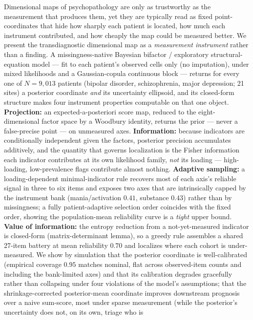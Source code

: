 Dimensional maps of psychopathology are only as trustworthy as the measurement
that produces them, yet they are typically read as fixed point-coordinates that
hide how sharply each patient is located, how much each instrument contributed,
and how cheaply the map could be measured better. We present the transdiagnostic
dimensional map as a \emph{measurement instrument} rather than a finding. A
missingness-native Bayesian bifactor / exploratory structural-equation model ---
fit to each patient's observed cells only (no imputation), under mixed
likelihoods and a Gaussian-copula continuous block --- returns for every one of
$N=9{,}013$ patients (bipolar disorder, schizophrenia, major depression; 21
sites) a posterior coordinate \emph{and} its uncertainty ellipsoid, and its
closed-form structure makes four instrument properties computable on that one
object. \textbf{Projection:} an expected-a-posteriori score map, reduced to the
eight-dimensional factor space by a Woodbury identity, returns the prior --- never
a false-precise point --- on unmeasured axes. \textbf{Information:} because
indicators are conditionally independent given the factors, posterior precision
accumulates additively, and the quantity that governs localization is the Fisher
information each indicator contributes at its own likelihood family, \emph{not}
its loading --- high-loading, low-prevalence flags contribute almost nothing.
\textbf{Adaptive sampling:} a loading-dependent minimal-indicator rule recovers
most of each axis's reliable signal in three to six items and exposes two axes
that are intrinsically capped by the instrument bank (mania/activation $0.41$,
substance $0.43$) rather than by missingness; a fully patient-adaptive selection
order coincides with the fixed order, showing the population-mean reliability
curve is a \emph{tight} upper bound. \textbf{Value of information:} the entropy
reduction from a not-yet-measured indicator is closed-form (matrix-determinant
lemma), so a greedy rule assembles a shared 27-item battery at mean reliability
$0.70$ and localizes where each cohort is under-measured. We show by simulation
that the posterior coordinate is well-calibrated (empirical coverage $0.95$ matches
nominal, flat across observed-item counts and including the bank-limited axes) and
that its calibration degrades gracefully rather than collapsing under four
violations of the model's assumptions; that the shrinkage-corrected posterior-mean
coordinate improves downstream prognosis over a naive sum-score, most under sparse
measurement (while the posterior's uncertainty does not, on its own, triage who is
